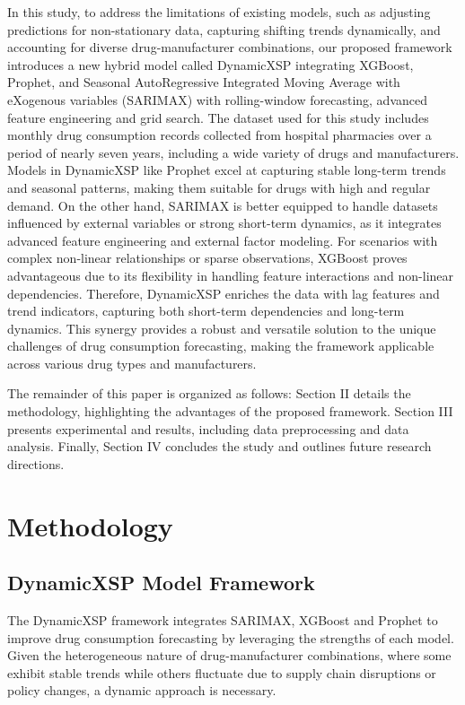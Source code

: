 \documentclass[journal]{IEEEtran}
\begin{document}
In this study, to address the limitations of existing models, such as adjusting predictions for non-stationary data, capturing shifting trends dynamically, and accounting for diverse drug-manufacturer combinations, our proposed framework introduces a new hybrid model called DynamicXSP integrating XGBoost, Prophet, and Seasonal AutoRegressive Integrated Moving Average with eXogenous variables (SARIMAX) with rolling-window forecasting, advanced feature engineering and grid search. The dataset used for this study includes monthly drug consumption records collected from hospital pharmacies over a period of nearly seven years, including a wide variety of drugs and manufacturers. Models in DynamicXSP like Prophet excel at capturing stable long-term trends and seasonal patterns, making them suitable for drugs with high and regular demand. On the other hand, SARIMAX is better equipped to handle datasets influenced by external variables or strong short-term dynamics, as it integrates advanced feature engineering and external factor modeling. For scenarios with complex non-linear relationships or sparse observations, XGBoost proves advantageous due to its flexibility in handling feature interactions and non-linear dependencies. Therefore, DynamicXSP enriches the data with lag features and trend indicators, capturing both short-term dependencies and long-term dynamics. This synergy provides a robust and versatile solution to the unique challenges of drug consumption forecasting, making the framework applicable across various drug types and manufacturers.

The remainder of this paper is organized as follows: Section II details the methodology, highlighting the advantages of the proposed framework. Section III presents experimental and results, including data preprocessing and data analysis. Finally, Section IV concludes the study and outlines future research directions.

\section{Methodology}
\subsection{DynamicXSP Model Framework}

The DynamicXSP framework integrates SARIMAX, XGBoost and Prophet to improve drug consumption forecasting by leveraging the strengths of each model. Given the heterogeneous nature of drug-manufacturer combinations, where some exhibit stable trends while others fluctuate due to supply chain disruptions or policy changes, a dynamic approach is necessary.
\end{document}
